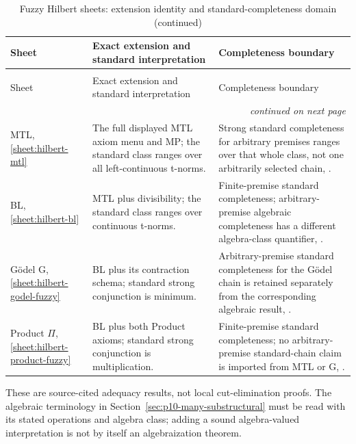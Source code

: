 \begingroup\small
\begin{longtable}{@{}p{.16\linewidth}p{.36\linewidth}p{.40\linewidth}@{}}
\caption{Fuzzy Hilbert sheets: extension identity and standard-completeness domain.}
\label{tab:p14-nonclassical-fuzzy}\\
\toprule
Sheet & Exact extension and standard interpretation & Completeness boundary \\
\midrule\endfirsthead
\caption[]{Fuzzy Hilbert sheets: extension identity and standard-completeness domain (continued)}\\
\toprule Sheet & Exact extension and standard interpretation & Completeness boundary \\
\midrule\endhead
\midrule\multicolumn{3}{r}{\emph{continued on next page}}\\
\endfoot
\endlastfoot
MTL, \ref{sheet:hilbert-mtl} & The full displayed MTL axiom menu and MP;
the standard class ranges over all left-continuous t-norms. & Strong
standard completeness for arbitrary premises ranges over that whole class,
not one arbitrarily selected chain, \cite{EstevaGodo2001,JeneiMontagna2002}. \\
\addlinespace
BL, \ref{sheet:hilbert-bl} & MTL plus divisibility; the standard class
ranges over continuous t-norms. & Finite-premise standard completeness;
arbitrary-premise algebraic completeness has a different algebra-class
quantifier, \cite{CignoliEstevaGodoTorrens2000}. \\
\addlinespace
G\"odel G, \ref{sheet:hilbert-godel-fuzzy} & BL plus its contraction
schema; standard strong conjunction is minimum. & Arbitrary-premise
standard completeness for the G\"odel chain is retained separately from
the corresponding algebraic result, \cite{Hajek1998,CintulaHajekNoguera2011}. \\
\addlinespace
Product \(\Pi\), \ref{sheet:hilbert-product-fuzzy} & BL plus both
Product axioms; standard strong conjunction is multiplication. &
Finite-premise standard completeness; no arbitrary-premise standard-chain
claim is imported from MTL or G, \cite{Hajek1998,CintulaHajekNoguera2011}. \\
\bottomrule
\end{longtable}\endgroup

These are source-cited adequacy results, not local cut-elimination proofs.
The algebraic terminology in Section~\ref{sec:p10-many-substructural}
must be read with its stated operations and algebra class; adding a sound
algebra-valued interpretation is not by itself an algebraization theorem.


